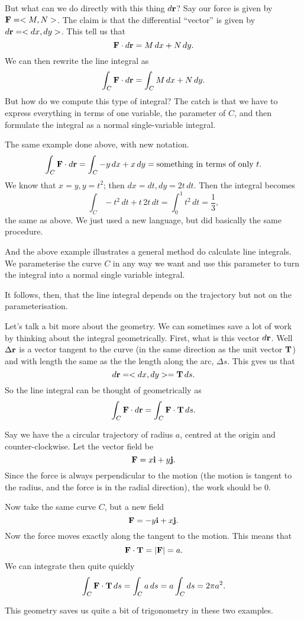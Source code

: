 But what can we do directly with this thing $d\boldsymbol{\mathbf{r}}$? Say our force is given by $\boldsymbol{\mathbf{F}} = <M,N>$. The claim is that the differential ``vector'' is given by $d\boldsymbol{\mathbf{r}} = <dx,dy>$. This tell us that 
\[ \boldsymbol{\mathbf{F}}\cdot d\boldsymbol{\mathbf{r}} = M\,dx + N\,dy. \]
We can then rewrite the line integral as 
\[ \int_C \boldsymbol{\mathbf{F}}\cdot d\boldsymbol{\mathbf{r}} = \int_C M\,dx + N\,dy. \]
But how do we compute this type of integral? The catch is that we have to express everything in terms of one variable, the parameter of $C$, and then formulate the integral as a normal single-variable integral. 

\bex
The same example done above, with new notation. 
\[ \int_C \boldsymbol{\mathbf{F}}\cdot d\boldsymbol{\mathbf{r}} = \int_C -y\,dx + x\,dy = \textrm{something in terms of only } t. \]
We know that $x=y,y=t^2$; then $dx = dt,dy=2t\,dt$. Then the integral becomes
\[ \int_C -t^2\,dt + t\,2t\,dt = \int_0^1 t^2\,dt = \frac 13, \]
the same as above. We just used a new language, but did basically the same procedure.
\eex 

And the above example illustrates a general method do calculate line integrals. We parameterise the curve $C$ in any way we want and use this parameter to turn the integral into a normal single variable integral. 

\brm
It follows, then, that the line integral depends on the trajectory but not on the parameterisation.
\erm

Let's talk a bit more about the geometry. We can sometimes save a lot of work by thinking about the integral geometrically. First, what is this vector $d\boldsymbol{\mathbf{r}}$. Well $\Delta \boldsymbol{\mathbf{r}}$ is a vector tangent to the curve (in the same direction as the unit vector $\boldsymbol{\mathbf{T}}$) and with length the same as the the length along the arc, $\Delta s$. This gves us that 
\[ d\boldsymbol{\mathbf{r}} = <dx,dy> = \boldsymbol{\mathbf{T}}\,ds. \]
So the line integral can be thought of geometrically as 
\[ \int_C \boldsymbol{\mathbf{F}}\cdot d\boldsymbol{\mathbf{r}} = \int_C \boldsymbol{\mathbf{F}} \cdot \boldsymbol{\mathbf{T}}\,ds. \]

\bex
Say we have the a circular trajectory of radius $a$, centred at the origin and counter-clockwise. Let the vector field be 
\[ \boldsymbol{\mathbf{F}} = x\boldsymbol{\mathbf{i}}+y\boldsymbol{\mathbf{j}}. \]
Since the force is always perpendicular to the motion (the motion is tangent to the radius, and the force is in the radial direction), the work should be 0.

Now take the same curve $C$, but a new field
\[ \boldsymbol{\mathbf{F}} = -y\boldsymbol{\mathbf{i}}+x\boldsymbol{\mathbf{j}}. \]
Now the force moves exactly along the tangent to the motion. This means that 
\[ \boldsymbol{\mathbf{F}}\cdot\boldsymbol{\mathbf{T}} = |\boldsymbol{\mathbf{F}}| = a. \]
We can integrate then quite quickly
\[ \int_C \boldsymbol{\mathbf{F}} \cdot \boldsymbol{\mathbf{T}}\,ds = \int_C a \,ds = a\int_C ds = 2\pi a^2. \]

This geometry saves us quite a bit of trigonometry in these two examples. 
\eex
